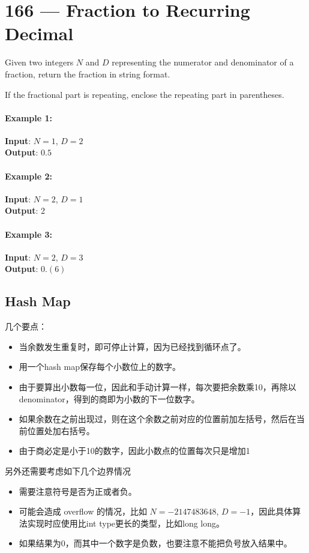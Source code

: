 \section{166 --- Fraction to Recurring Decimal}
Given two integers $N$ and $D$ representing the numerator and denominator of a fraction, return the fraction in string format.
\par
If the fractional part is repeating, enclose the repeating part in parentheses.
\paragraph{Example 1:}
\begin{flushleft}
\textbf{Input}: $N = 1$, $D = 2$
\\
\textbf{Output}: $0.5$
\end{flushleft}
\paragraph{Example 2:}
\begin{flushleft}
\textbf{Input}: $N = 2$, $D = 1$
\\
\textbf{Output}: 2
\end{flushleft}
\paragraph{Example 3:}
\begin{flushleft}
\textbf{Input}: $N = 2$, $D = 3$
\\
\textbf{Output}: $0.(6)$
\end{flushleft}
\subsection{Hash Map}

几个要点：
\begin{itemize}
    \item 当余数发生重复时，即可停止计算，因为已经找到循环点了。
    \item 用一个hash map保存每个小数位上的数字。
    \item 由于要算出小数每一位，因此和手动计算一样，每次要把余数乘10，再除以denominator，得到的商即为小数的下一位数字。
    \item 如果余数在之前出现过，则在这个余数之前对应的位置前加左括号，然后在当前位置处加右括号。
    \item 由于商必定是小于10的数字，因此小数点的位置每次只是增加1
\end{itemize}
另外还需要考虑如下几个边界情况
\begin{itemize}
    \item 需要注意符号是否为正或者负。
    \item 可能会造成 overflow 的情况，比如 $N = -2147483648$, $D = -1$，因此具体算法实现时应使用比int type更长的类型，比如long long。
    \item 如果结果为0，而其中一个数字是负数，也要注意不能把负号放入结果中。
\end{itemize}


